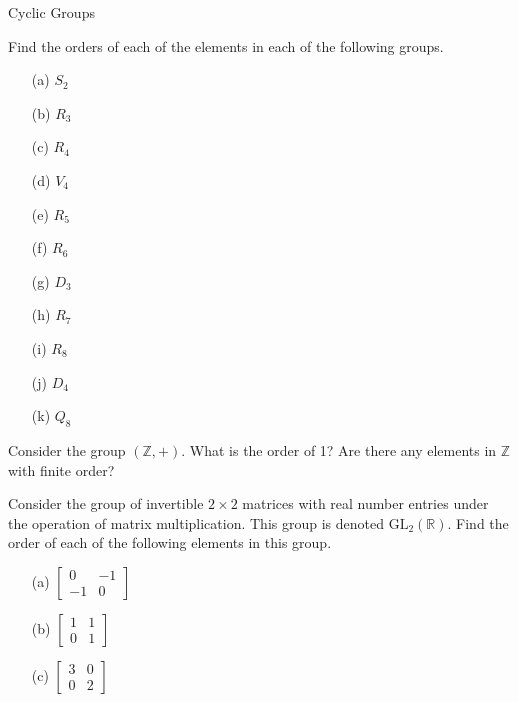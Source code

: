 \begin{section}{Cyclic Groups}
\begin{exercise}\label{exer:computing_orders}
Find the orders of each of the elements in each of the following groups.
\begin{multicols}{2}
\begin{enumerate}
\item[(a)] \(S_2\)
\item[(b)] \(R_3\)
\item[(c)] \(R_4\)
\item[(d)] \(V_4\)
\item[(e)] \(R_5\)
\item[(f)] \(R_6\)
\item[(g)] \(D_3\)
\item[(h)] \(R_7\)
\item[(i)] \(R_8\)
\item[(j)] \(D_4\)
\item[(k)] \(Q_8\)
\end{enumerate}
\end{multicols}
\end{exercise}

\begin{exercise}
Consider the group \((\mathbb{Z},+)\).  What is the order of 1?  Are there any elements in \(\mathbb{Z}\) with finite order?
\end{exercise}

\begin{exercise}
Consider the group of invertible \(2\times 2\) matrices with real number entries under the operation of matrix multiplication.  This group is denoted \(\mathrm{GL}_2(\mathbb{R})\).  Find the order of each of the following elements in this group.
\begin{multicols}{3}
\begin{enumerate}
\item[(a)] \(\begin{bmatrix} 0 & -1\\ -1 & 0\end{bmatrix}\)
\item[(b)] \(\begin{bmatrix} 1 & 1\\ 0 & 1\end{bmatrix}\)
\item[(c)] \(\begin{bmatrix} 3 & 0\\ 0 & 2\end{bmatrix}\)
\end{enumerate}
\end{multicols}
\end{exercise}


\end{section}
